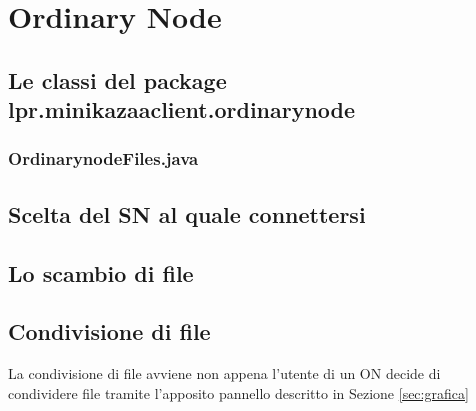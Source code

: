 \chapter{Ordinary Node}
\section{Le classi del package lpr.minikazaaclient.ordinarynode}
\subsection{OrdinarynodeFiles.java}\label{sec:on_files}

\section{Scelta del SN al quale connettersi}\label{sec:scelta_sn}
\section{Lo scambio di file}\label{sec:scambio}
\section{Condivisione di file}
La condivisione di file avviene non appena l'utente di un ON decide di condividere file tramite l'apposito pannello descritto in Sezione \ref{sec:grafica}

